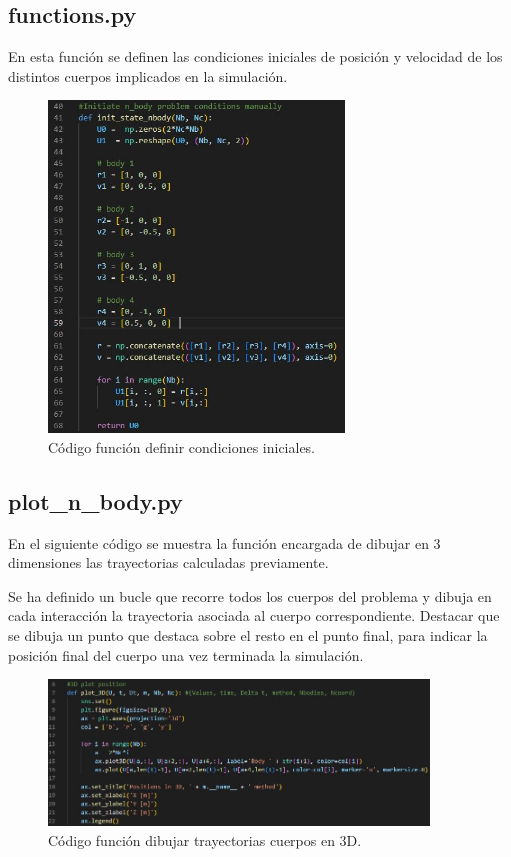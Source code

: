 \documentclass[12pt,a4paper]{article}
\begin{document}
\subsection{functions.py}
En esta función se definen las condiciones iniciales de posición y velocidad de los distintos cuerpos implicados en la simulación.
\begin{figure}[H]
	\centering
	\includegraphics[width=0.7\textwidth]{FIGURES/mil5/codigo/init_1.JPG}
	\caption{Código función definir condiciones iniciales.}
	\label{init_1}
\end{figure}


\subsection{plot\_n\_body.py}
En el siguiente código se muestra la función encargada de dibujar en 3 dimensiones las trayectorias calculadas previamente.

Se ha definido un bucle que recorre todos los cuerpos del problema y dibuja en cada interacción la trayectoria asociada al cuerpo correspondiente. Destacar que se dibuja un punto que destaca sobre el resto en el punto final, para indicar la posición final del cuerpo una vez terminada la simulación. 
\begin{figure}[H]
	\centering
	\includegraphics[width=0.9\textwidth]{FIGURES/mil5/codigo/plot_n_body_1.JPG}
	\caption{Código función dibujar trayectorias cuerpos en 3D.}
	\label{plot_n_body_1}
\end{figure}
\end{document}
